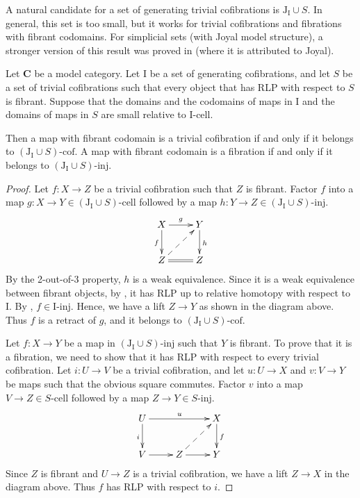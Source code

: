 \documentclass{tac}
\theoremstyle{definition}
\newcommand{\cat}[1]{\mathbf{#1}}
\newcommand{\C}{\cat{C}}
\newcommand{\I}{\mathrm{I}}
\newcommand{\J}{\mathrm{J}}
\newcommand{\class}[2]{#1\text{-}\mathrm{#2}}
\newcommand{\Iinj}[1][\I]{\class{#1}{inj}}
\newcommand{\Icell}[1][\I]{\class{#1}{cell}}
\newcommand{\Icof}[1][\I]{\class{#1}{cof}}
\begin{document}
A natural candidate for a set of generating trivial cofibrations is $\J_\I \cup S$.
In general, this set is too small, but it works for trivial cofibrations and fibrations with fibrant codomains.
For simplicial sets (with Joyal model structure), a stronger version of this result was proved in \cite{lurie-topos} (where it is attributed to Joyal).

\begin{prop}
Let $\C$ be a model category.
Let $\I$ be a set of generating cofibrations, and let $S$ be a set of trivial cofibrations
such that every object that has RLP with respect to $S$ is fibrant.
Suppose that the domains and the codomains of maps in $\I$ and the domains of maps in $S$ are small relative to $\Icell$.

Then a map with fibrant codomain is a trivial cofibration if and only if it belongs to $\Icof[(\J_\I \cup S)]$.
A map with fibrant codomain is a fibration if and only if it belongs to $\Iinj[(\J_\I \cup S)]$.
\end{prop}
\begin{proof}
Let $f : X \to Z$ be a trivial cofibration such that $Z$ is fibrant.
Factor $f$ into a map $g : X \to Y \in \Icell[(\J_\I \cup S)]$ followed by a map $h : Y \to Z \in \Iinj[(\J_\I \cup S)]$.
\[ \xymatrix{ X \ar[r]^g \ar[d]_f & Y \ar[d]^h \\
              Z \ar@{=}[r] \ar@{-->}[ur] & Z
            } \]
By the 2-out-of-3 property, $h$ is a weak equivalence.
Since it is a weak equivalence between fibrant objects, by , it has RLP up to relative homotopy with respect to $\I$.
By , $f \in \Iinj$.
Hence, we have a lift $Z \to Y$ as shown in the diagram above.
Thus $f$ is a retract of $g$, and it belongs to $\Icof[(\J_\I \cup S)]$.

Let $f : X \to Y$ be a map in $\Iinj[(\J_\I \cup S)]$ such that $Y$ is fibrant.
To prove that it is a fibration, we need to show that it has RLP with respect to every trivial cofibration.
Let $i : U \to V$ be a trivial cofibration, and let $u : U \to X$ and $v : V \to Y$ be maps such that the obvious square commutes.
Factor $v$ into a map $V \to Z \in \Icell[S]$ followed by a map $Z \to Y \in \Iinj[S]$.
\[ \xymatrix{ U \ar[rr]^u \ar[d]_i & & X \ar[d]^f \\
              V \ar[r] & Z \ar[r] \ar@{-->}[ur] & Y
            } \]
Since $Z$ is fibrant and $U \to Z$ is a trivial cofibration, we have a lift $Z \to X$ in the diagram above.
Thus $f$ has RLP with respect to $i$.
\end{proof}
\end{document}
